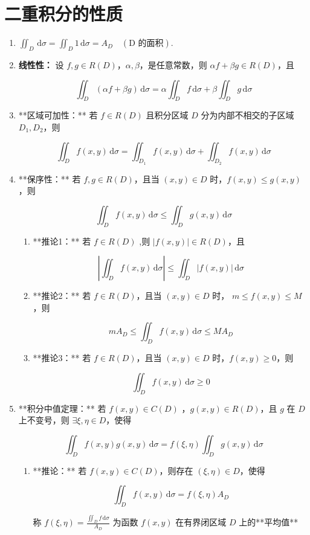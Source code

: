 \documentclass[lang = zh , final , oneside , openany , titlepage , zihao = -4 , linespread = 1.3 , baselineskip = false , cjk-font = windows , text-font = newtx , math-font = newtx]{sjtureport}
\begin{document}
\section{二重积分的性质}

\begin{enumerate}
    \item $\displaystyle\iint_D\,\mathrm{d}\sigma = \iint_D 1\,\mathrm{d}\sigma = A_D \quad\left(\text{D 的面积}\right)$.
    \item \textbf{线性性：} 设 $f,g\in R(D)$，$\alpha , \beta$，是任意常数，则 $\alpha f +\beta g \in R(D)$，且

    $$
    \iint_D (\alpha f +\beta g)\,\mathrm{d}\sigma = \alpha \iint_D f\,\mathrm{d}\sigma + \beta \iint_D g\,\mathrm{d}\sigma
    $$
    
    \item **区域可加性：** 若 $f\in R(D)$ 且积分区域 $D$ 分为内部不相交的子区域 $D_1 , D_2$，则

    $$
    \iint_D f(x,y) \,\mathrm{d}\sigma = \iint_{D_1} f(x,y)\,\mathrm{d}\sigma + \iint_{D_2} f(x,y)\,\mathrm{d}\sigma
    $$

    \item **保序性：** 若 $f,g\in R(D)$，且当 $(x,y)\in D$ 时，$f(x,y)\leq g(x,y)$，则

    $$
    \iint_D f(x,y)\,\mathrm{d}\sigma \leq \iint_D g(x,y)\,\mathrm{d}\sigma
    $$
    \begin{enumerate}
        \item **推论1：** 若 $f\in R(D)$ ,则 $\vert f(x,y) \vert \in R(D)$，且

   $$
    \left\vert \iint_D f(x,y)\,\mathrm{d}\sigma \right\vert \leq \iint_D \vert f(x,y) \vert \,\mathrm{d}\sigma
   $$

        \item **推论2：** 若 $f\in R(D)$，且当 $(x,y)\in D$ 时， $m\leq f(x,y) \leq M$，则

   $$
    mA_D \leq \iint_D f(x,y)\,\mathrm{d}\sigma \leq MA_D
   $$
        \item **推论3：** 若 $f\in R(D)$，且当 $(x,y)\in D$ 时，$f(x,y) \geq 0$，则

   $$
    \iint_D f(x,y)\,\mathrm{d}\sigma \geq 0
   $$
    \end{enumerate}
    \item **积分中值定理：** 若 $f(x,y)\in C(D)$ ，$g(x,y)\in R(D)$，且 $g$ 在 $D$ 上不变号，则 $\exists \xi , \eta \in D$，使得

    $$
    \iint_D f(x,y)g(x,y)\,\mathrm{d}\sigma = f(\xi ,\eta )\iint_D g(x,y)\,\mathrm{d}\sigma
    $$

    \begin{enumerate}
        \item **推论：** 若 $f(x,y)\in C(D)$，则存在 $(\xi , \eta )\in D$，使得

   $$
    \iint_D f(x,y)\,\mathrm{d}\sigma = f(\xi ,\eta )A_D
   $$

   称 $f(\xi,\eta) = \frac{\iint_D f\,\mathrm{d}\sigma}{A_D}$ 为函数 $f(x,y)$ 在有界闭区域 $D$ 上的**平均值**
    \end{enumerate}
\end{enumerate}
\end{document}
